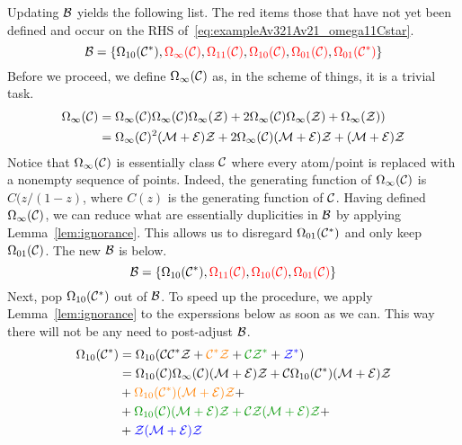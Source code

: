 \documentclass[12pt, a4paper, twoside]{report}
\begin{document}
Updating $\mathcal{B}$ yields the following list. The red items those that have not yet been defined and occur on the RHS of~\eqref{eq:exampleAv321Av21_omega11Cstar}.
$$\mathcal{B} = \{\Omega_{10}(\mathcal{C}^*),\textcolor{red}{\Omega_\infty(\mathcal{C})}, \textcolor{red}{\Omega_{11}(\mathcal{C})},\textcolor{red}{\Omega_{10}(\mathcal{C})}, \textcolor{red}{\Omega_{01}(\mathcal{C})}, \textcolor{red}{\Omega_{01}(\mathcal{C}^*)}\}$$
Before we proceed, we define $\Omega_\infty(\mathcal{C})$ as, in the scheme of things, it is a trivial task.
\begin{align}
  \begin{aligned}
    \Omega_\infty(\mathcal{C}) &= \Omega_\infty(\mathcal{C})\Omega_\infty(\mathcal{C})\Omega_\infty(\mathcal{Z}) + 2\Omega_\infty(\mathcal{C})\Omega_\infty(\mathcal{Z}) + \Omega_\infty(\mathcal{Z}))\\
    &= \Omega_\infty(\mathcal{C})^2(\mathcal{M}+\mathcal{E})\mathcal{Z} + 2\Omega_\infty(\mathcal{C})(\mathcal{M}+\mathcal{E})\mathcal{Z} + (\mathcal{M}+\mathcal{E})\mathcal{Z}
  \end{aligned}
  \label{eq:exampleAv321Av21_omegainftyC}
\end{align}
Notice that $\Omega_\infty(\mathcal{C})$ is essentially class $\mathcal{C}$ where every atom/point is replaced with a nonempty sequence of points. Indeed, the generating function of $\Omega_\infty(\mathcal{C})$ is $C(z/(1-z)$, where $C(z)$ is the generating function of $\mathcal{C}$. Having defined $\Omega_\infty(\mathcal{C})$, we can reduce what are essentially duplicities in $\mathcal{B}$ by applying Lemma~\ref{lem:ignorance}. This allows us to disregard $\Omega_{01}(\mathcal{C}^*)$ and only keep $\Omega_{01}(\mathcal{C})$. The new $\mathcal{B}$ is below.
$$\mathcal{B} = \{\Omega_{10}(\mathcal{C}^*), \textcolor{red}{\Omega_{11}(\mathcal{C})},\textcolor{red}{\Omega_{10}(\mathcal{C})}, \textcolor{red}{\Omega_{01}(\mathcal{C})}\}$$
Next, pop $\Omega_{10}(\mathcal{C}^*)$ out of $\mathcal{B}$. To speed up the procedure, we apply Lemma~\ref{lem:ignorance} to the experssions below as soon as we can. This way there will not be any need to post-adjust $\mathcal{B}$. 
\begin{align}
  \begin{aligned}
  \Omega_{10}(\Cstar) &= \Omega_{10}(\C\Cstar\Z + \textcolor{orange}{\Cstar\Z} + \textcolor{green}{\C\Z^*} + \textcolor{blue}{\Z^*})\\
                      &= \Omega_{10}(\C)\Omega_\infty(\C)(\M+\EE)\Z + \C\Omega_{10}(\Cstar)(\M+\EE)\Z\\ %
                      &+\textcolor{orange}{\Omega_{10}(\Cstar)(\M+\EE)\Z}+\\ %
                      &+\textcolor{green}{\Omega_{10}(\C)(\M+\EE)\Z + \C\Z(\M+\EE)\Z} +\\
                      &+\textcolor{blue}{\Z(\M+\EE)\Z}
                    \end{aligned}
                        \label{eq:exampleAv321Av21_omega10Cstar}
\end{align}
\end{document}

